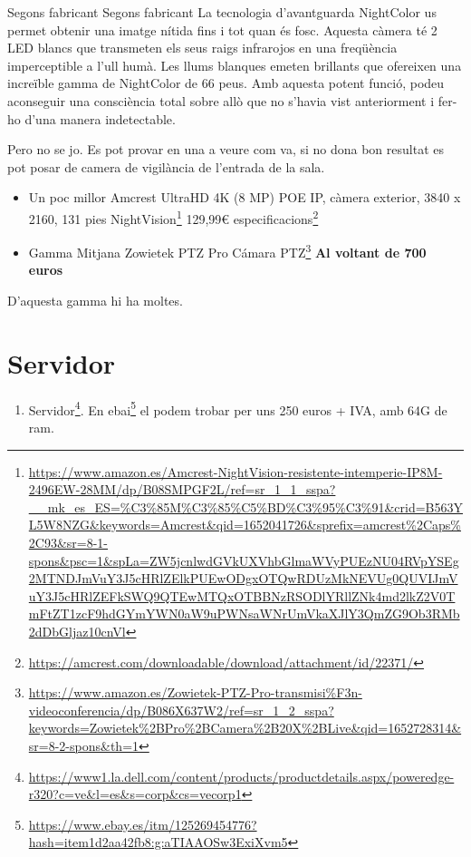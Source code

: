 \documentclass[
  10pt,
]{krantz}
\DeclareRobustCommand{\href}[2]{#2\footnote{\url{#1}}}
\providecommand{\tightlist}{%
  \setlength{\itemsep}{0pt}\setlength{\parskip}{0pt}}
\begin{document}
\begin{rmdinfo}{Segons fabricant}
Segons fabricant La tecnologia d'avantguarda NightColor us permet obtenir una imatge nítida fins i tot quan és fosc. Aquesta càmera té 2 LED blancs que transmeten els seus raigs infrarojos en una freqüència imperceptible a l'ull humà. Les llums blanques emeten brillants que ofereixen una increïble gamma de NightColor de 66 peus. Amb aquesta potent funció, podeu aconseguir una consciència total sobre allò que no s'havia vist anteriorment i fer-ho d'una manera indetectable.

Pero no se jo. Es pot provar en una a veure com va, si no dona bon resultat es pot posar de camera de vigilància de l'entrada de la sala.

\end{rmdinfo}

\begin{itemize}
\item
  Un poc millor \href{https://www.amazon.es/Amcrest-NightVision-resistente-intemperie-IP8M-2496EW-28MM/dp/B08SMPGF2L/ref=sr_1_1_sspa?__mk_es_ES=\%C3\%85M\%C3\%85\%C5\%BD\%C3\%95\%C3\%91\&crid=B563YL5W8NZG\&keywords=Amcrest\&qid=1652041726\&sprefix=amcrest\%2Caps\%2C93\&sr=8-1-spons\&psc=1\&spLa=ZW5jcnlwdGVkUXVhbGlmaWVyPUEzNU04RVpYSEg2MTNDJmVuY3J5cHRlZElkPUEwODgxOTQwRDUzMkNEVUg0QUVIJmVuY3J5cHRlZEFkSWQ9QTEwMTQxOTBBNzRSODlYRllZNk4md2lkZ2V0TmFtZT1zcF9hdGYmYWN0aW9uPWNsaWNrUmVkaXJlY3QmZG9Ob3RMb2dDbGljaz10cnVl}{Amcrest UltraHD 4K (8 MP) POE IP, càmera exterior, 3840 x 2160, 131 pies NightVision} 129,99€ \href{https://amcrest.com/downloadable/download/attachment/id/22371/}{especificacions}
\item
  Gamma Mitjana \href{https://www.amazon.es/Zowietek-PTZ-Pro-transmisi\%F3n-videoconferencia/dp/B086X637W2/ref=sr_1_2_sspa?keywords=Zowietek\%2BPro\%2BCamera\%2B20X\%2BLive\&qid=1652728314\&sr=8-2-spons\&th=1}{Zowietek PTZ Pro Cámara PTZ} \textbf{Al voltant de 700 euros}
\end{itemize}

D'aquesta gamma hi ha moltes.

\hypertarget{servidor}{%
\chapter{Servidor}\label{servidor}}

\begin{enumerate}
\def\labelenumi{\arabic{enumi}.}
\tightlist
\item
  \href{https://www1.la.dell.com/content/products/productdetails.aspx/poweredge-r320?c=ve\&l=es\&s=corp\&cs=vecorp1}{Servidor}. En \href{https://www.ebay.es/itm/125269454776?hash=item1d2aa42fb8:g:aTIAAOSw3ExiXvm5}{ebai} el podem trobar per uns 250 euros + IVA, amb 64G de ram.
\end{enumerate}
\end{document}
